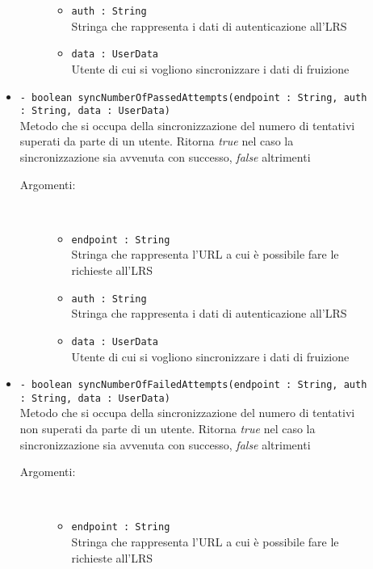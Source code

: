 \documentclass[../Tesi.tex]{subfiles}
\begin{document}
\begin{description}
\begin{itemize}
\begin{description}
\begin{itemize}
						\item \texttt{auth : String}\\
						Stringa che rappresenta i dati di autenticazione all'LRS

						\item \texttt{data : UserData}\\
						Utente di cui si vogliono sincronizzare i dati di fruizione
					\end{itemize}
				\end{description}

				\item \texttt{- boolean syncNumberOfPassedAttempts(endpoint : String, auth : String, data : UserData)}\\
				Metodo che si occupa della sincronizzazione del numero di tentativi superati da parte di un utente. Ritorna \textit{true} nel caso la sincronizzazione sia avvenuta con successo, \textit{false} altrimenti
				\begin{description}
					\item[Argomenti:] \
					\begin{itemize}
						\item \texttt{endpoint : String}\\
						Stringa che rappresenta l'URL a cui è possibile fare le richieste all'LRS

						\item \texttt{auth : String}\\
						Stringa che rappresenta i dati di autenticazione all'LRS

						\item \texttt{data : UserData}\\
						Utente di cui si vogliono sincronizzare i dati di fruizione
					\end{itemize}
				\end{description}

				\item \texttt{- boolean syncNumberOfFailedAttempts(endpoint : String, auth : String, data : UserData)}\\
				Metodo che si occupa della sincronizzazione del numero di tentativi non superati da parte di un utente. Ritorna \textit{true} nel caso la sincronizzazione sia avvenuta con successo, \textit{false} altrimenti
				\begin{description}
					\item[Argomenti:] \
					\begin{itemize}
						\item \texttt{endpoint : String}\\
						Stringa che rappresenta l'URL a cui è possibile fare le richieste all'LRS


\end{itemize}
\end{description}
\end{itemize}
\end{description}
\end{document}
